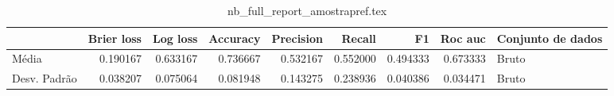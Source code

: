 \begin{table}
\centering
\caption{nb_full_report_amostrapref.tex}
\label{nb_full_report_amostrapref.tex}
\begin{tabular}{lrrrrrrrl}
\toprule
{} &  Brier  loss &  Log loss &  Accuracy  &  Precision  &   Recall  &       F1  &  Roc auc  & Conjunto de dados \\
\midrule
Média        &     0.190167 &  0.633167 &   0.736667 &    0.532167 &  0.552000 &  0.494333 &  0.673333 &             Bruto \\
Desv. Padrão &     0.038207 &  0.075064 &   0.081948 &    0.143275 &  0.238936 &  0.040386 &  0.034471 &             Bruto \\
\bottomrule
\end{tabular}
\end{table}
